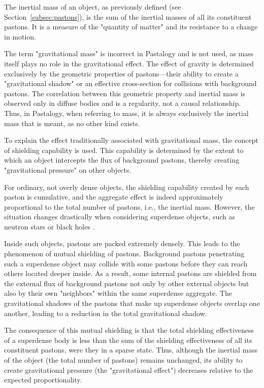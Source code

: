 \documentclass[pdflatex,sn-mathphys-num,referee]{sn-jnl}
\begin{document}
The inertial mass of an object, as previously defined (see Section~\ref{subsec:pastons}), is the sum of the inertial masses of all its constituent pastons. It is a measure of the "quantity of matter" and its resistance to a change in motion.

The term "gravitational mass" is incorrect in Pastalogy and is not used, as mass itself plays no role in the gravitational effect. The effect of gravity is determined exclusively by the geometric properties of pastons---their ability to create a "gravitational shadow" or an effective cross-section for collisions with background pastons. The correlation between this geometric property and inertial mass is observed only in diffuse bodies and is a regularity, not a causal relationship. Thus, in Pastalogy, when referring to mass, it is always exclusively the inertial mass that is meant, as no other kind exists.

To explain the effect traditionally associated with gravitational mass, the concept of shielding capability is used. This capability is determined by the extent to which an object intercepts the flux of background pastons, thereby creating "gravitational pressure" on other objects.

For ordinary, not overly dense objects, the shielding capability created by each paston is cumulative, and the aggregate effect is indeed approximately proportional to the total number of pastons, i.e., the inertial mass. However, the situation changes drastically when considering superdense objects, such as neutron stars or black holes \cite{shapiro-teukolsky1983}.

Inside such objects, pastons are packed extremely densely. This leads to the phenomenon of mutual shielding of pastons. Background pastons penetrating such a superdense object may collide with some pastons before they can reach others located deeper inside. As a result, some internal pastons are shielded from the external flux of background pastons not only by other external objects but also by their own "neighbors" within the same superdense aggregate. The gravitational shadows of the pastons that make up superdense objects overlap one another, leading to a reduction in the total gravitational shadow.

The consequence of this mutual shielding is that the total shielding effectiveness of a superdense body is less than the sum of the shielding effectiveness of all its constituent pastons, were they in a sparse state. Thus, although the inertial mass of the object (the total number of pastons) remains unchanged, its ability to create gravitational pressure (the "gravitational effect") decreases relative to the expected proportionality.
\end{document}
